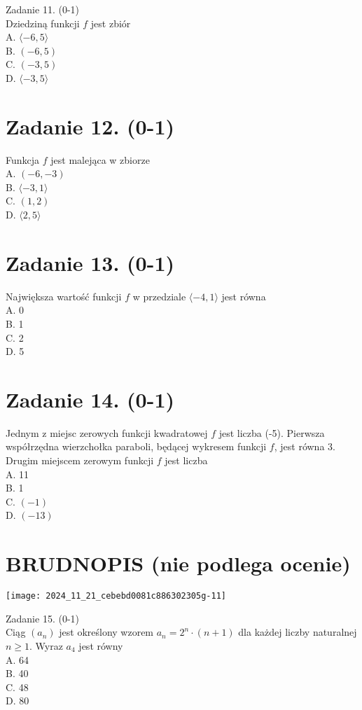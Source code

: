 \documentclass[10pt]{article}
\begin{document}
Zadanie 11. (0-1)\\
Dziedziną funkcji \(f\) jest zbiór\\
A. \(\langle-6,5\rangle\)\\
B. \((-6,5)\)\\
C. \((-3,5)\)\\
D. \(\langle-3,5\rangle\)

\section*{Zadanie 12. (0-1)}
Funkcja \(f\) jest malejąca w zbiorze\\
A. \((-6,-3)\)\\
B. \(\langle-3,1\rangle\)\\
C. \((1,2)\)\\
D. \(\langle 2,5\rangle\)

\section*{Zadanie 13. (0-1)}
Największa wartość funkcji \(f\) w przedziale \(\langle-4,1\rangle\) jest równa\\
A. 0\\
B. 1\\
C. 2\\
D. 5

\section*{Zadanie 14. (0-1)}
Jednym z miejsc zerowych funkcji kwadratowej \(f\) jest liczba (-5). Pierwsza współrzędna wierzchołka paraboli, będącej wykresem funkcji \(f\), jest równa 3.\\
Drugim miejscem zerowym funkcji \(f\) jest liczba\\
A. 11\\
B. 1\\
C. \((-1)\)\\
D. \((-13)\)

\section*{BRUDNOPIS (nie podlega ocenie)}
\begin{center}
\texttt{[image: 2024\_11\_21\_cebebd0081c886302305g-11]}
\end{center}

Zadanie 15. (0-1)\\
Ciąg \(\left(a_{n}\right)\) jest określony wzorem \(a_{n}=2^{n} \cdot(n+1)\) dla każdej liczby naturalnej \(n \geq 1\). Wyraz \(a_{4}\) jest równy\\
A. 64\\
B. 40\\
C. 48\\
D. 80
\end{document}
